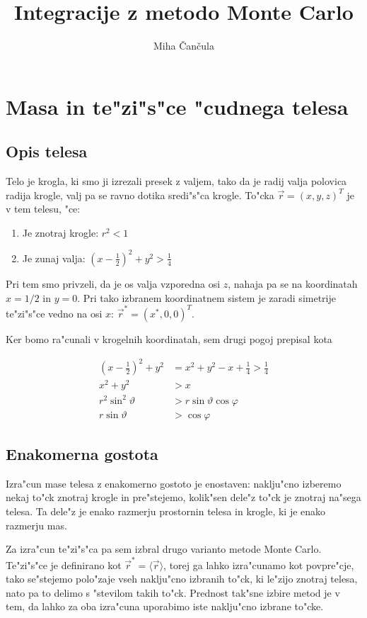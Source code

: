 \documentclass[a4paper,10pt]{article}
\title{Integracije z metodo Monte Carlo}
\author{Miha \v Can\v cula}
\renewcommand{\theta}{\vartheta}
\renewcommand{\phi}{\varphi}
\begin{document}
\maketitle

\section{Masa in te"zi"s"ce "cudnega telesa}

\subsection{Opis telesa}

Telo je krogla, ki smo ji izrezali presek z valjem, tako da je radij valja polovica radija krogle, valj pa se ravno dotika sredi"s"ca krogle. To"cka $\vec r = (x,y,z)^T$ je v tem telesu, "ce:

\begin{enumerate}
 \item Je znotraj krogle: $r^2 < 1$
 \item Je zunaj valja: $(x-\frac{1}{2})^2 + y^2 > \frac{1}{4}$
\end{enumerate}

Pri tem smo privzeli, da je os valja vzporedna osi $z$, nahaja pa se na koordinatah $x=1/2$ in $y=0$. Pri tako izbranem koordinatnem sistem je zaradi simetrije te"zi"s"ce vedno na osi $x$: $\vec r^* = (x^*,0,0)^T$. 

Ker bomo ra"cunali v krogelnih koordinatah, sem drugi pogoj prepisal kota

\begin{align}
 \left(x-\frac{1}{2}\right)^2 + y^2 &= x^2 + y^2 - x + \frac{1}{4} > \frac{1}{4} \\
  x^2 + y^2 &> x \\
  r^2\sin^2\theta &> r\sin\theta\cos\phi \\
  r\sin\theta &> \cos\phi
\end{align}


\subsection{Enakomerna gostota}
Izra"cun mase telesa z enakomerno gostoto je enostaven: naklju"cno izberemo nekaj to"ck znotraj krogle in pre"stejemo, kolik"sen dele"z to"ck je znotraj na"sega telesa. Ta dele"z je enako razmerju prostornin telesa in krogle, ki je enako razmerju mas. 

Za izra"cun te"zi"s"ca pa sem izbral drugo varianto metode Monte Carlo. Te"zi"s"ce je definirano kot $\vec r^* = \langle\vec r\rangle$, torej ga lahko izra"cunamo kot povpre"cje, tako se"stejemo polo"zaje vseh naklju"cno izbranih to"ck, ki le"zijo znotraj telesa, nato pa to delimo s "stevilom takih to"ck. Prednost tak"sne izbire metod je v tem, da lahko za oba izra"cuna uporabimo iste naklju"cno izbrane to"cke. 
\end{document}
